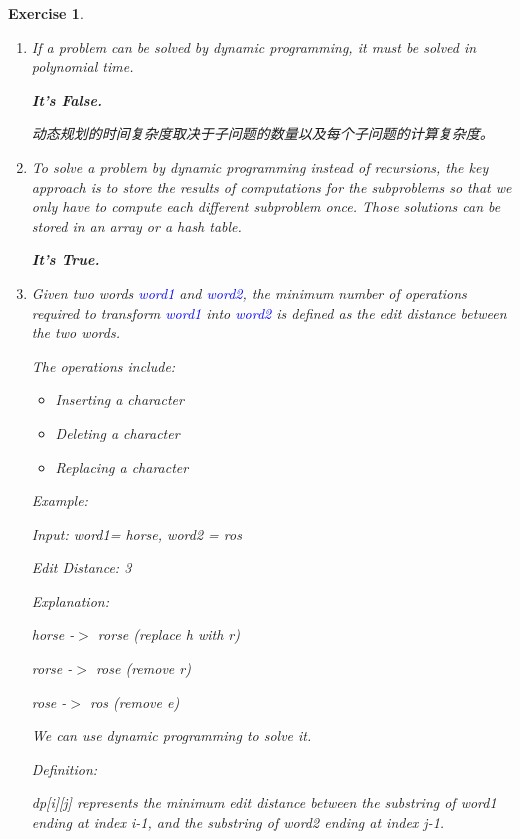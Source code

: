 \documentclass{article}
\newtheorem*{Exercise}{Exercise}
\begin{document}
\hspace*{\fill}\par

\begin{Exercise}
    \begin{enumerate}
        \item If a problem can be solved by dynamic programming, it must be solved in polynomial time. \par
        \textbf{It's False.}\par
        动态规划的时间复杂度取决于子问题的数量以及每个子问题的计算复杂度。
        \item To solve a problem by dynamic programming instead of recursions, the key approach is to store the results of computations for the subproblems so that we only have to compute each different subproblem once.  Those solutions can be stored in an array or a hash table.  \par
        \textbf{It's True.}\par
        \item Given two words \textcolor{blue}{word1} and \textcolor{blue}{word2}, the minimum number of operations required to transform \textcolor{blue}{word1} into \textcolor{blue}{word2} is defined as the edit distance between the two words.\par
        The operations include:\par
        \begin{itemize}
            \item Inserting a character
            \item Deleting a character
            \item Replacing a character
        \end{itemize}
        Example:\par
        Input: word1= horse, word2 = ros\par
        Edit Distance: 3\par
        Explanation:\par
        horse -$>$ rorse (replace h with r)\par
        rorse -$>$ rose (remove r)\par
        rose -$>$ ros (remove e)\par
        We can use dynamic programming to solve it.\par
        Definition: \par
        dp[i][j] represents the minimum edit distance between the substring of word1 ending at index i-1, and the substring of word2 ending at index j-1.\par

\end{enumerate}
\end{Exercise}
\end{document}
